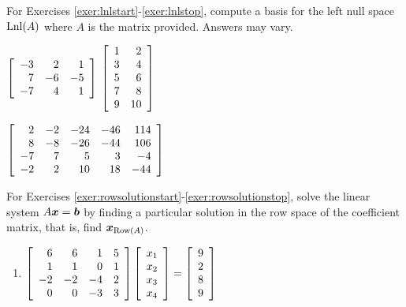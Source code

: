 \noindent For Exercises \ref{exer:lnlstart}-\ref{exer:lnlstop}, compute a basis for the left null space $\lnl(A)$ where $A$ is the matrix provided. Answers may vary.
\begin{enumerate}[!HW!, label=$\spadesuit$ \arabic*., ref=\arabic*]
\begin{multicols}{3}
\item\label{exer:lnlstart} $\mtx{rrr}{-3&2&1\\7&-6&-5\\-7&4&1}$ %
\itemspade $\mtx{rr}{1&2\\3&4\\5&6\\7&8\\9&10}$ %
\item\label{exer:lnlstop} $ \mtx{rrrrr}{2&-2&-24&-46&114\\8&-8&-26&-44&106\\-7&7&5&3&-4\\-2&2&10&18&-44}$ %
\end{multicols}
\end{enumerate}

\noindent For Exercises \ref{exer:rowsolutionstart}-\ref{exer:rowsolutionstop}, solve the linear system $A\bb x=\bb b$ by finding a particular solution in the row space of the coefficient matrix, that is, find $\bb x_{\row(A)}$.
\begin{enumerate}[!HW!, label=$\spadesuit$ \arabic*., ref=\arabic*]
\item\label{exer:rowsolutionstop} $\mtx{rrrr}{6&6&1&5\\1&1&0&1\\-2&-2&-4&2\\0&0&-3&3}\vr{x_1\\x_2\\x_3\\x_4} = \vr{9\\2\\8\\9}$ %
\end{enumerate}

 \mbox{}\vfill
 
\pagebreak